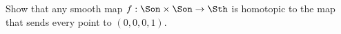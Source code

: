 Show that any smooth map $f:\Son\times \Son\rightarrow \Sth$ is
homotopic to the map that sends every point to $(0,0,0,1)$.
